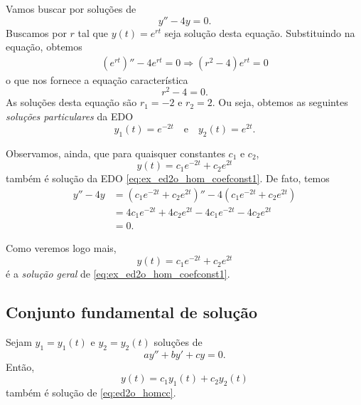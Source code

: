 \begin{ex}\label{ex:ed2o_homcc}
  Vamos buscar por soluções de
  \begin{equation}\label{eq:ex_ed2o_hom_coefconst1}
    y'' - 4y = 0.
  \end{equation}
  Buscamos por $r$ tal que $y(t) = e^{rt}$ seja solução desta equação. Substituindo na equação, obtemos
  \begin{align}
    \left(e^{rt}\right)'' - 4e^{rt} = 0 \Rightarrow (r^2 - 4)e^{rt} = 0
  \end{align}
  o que nos fornece a equação característica
  \begin{equation}
    r^2 - 4 = 0.
  \end{equation}
  As soluções desta equação são $r_1 = -2$ e $r_2 = 2$. Ou seja, obtemos as seguintes \emph{soluções particulares} da EDO
  \begin{equation}
    y_1(t) = e^{-2t}\quad\text{e}\quad y_2(t) = e^{2t}.
  \end{equation}

  Observamos, ainda, que para quaisquer constantes $c_1$ e $c_2$,
  \begin{equation}
    y(t) = c_1e^{-2t} + c_2e^{2t}
  \end{equation}
  também é solução da EDO \eqref{eq:ex_ed2o_hom_coefconst1}. De fato, temos
  \begin{align}
    y'' - 4y &= \left(c_1e^{-2t} + c_2e^{2t}\right)'' -4\left(c_1e^{-2t}+c_2e^{2t}\right) \\
             &= 4c_1e^{-2t} + 4c_2e^{2t} -4c_1e^{-2t} -4c_2e^{2t} \\
             &= 0.
  \end{align}

  Como veremos logo mais,
  \begin{equation}
    y(t) = c_1e^{-2t} + c_2e^{2t}
  \end{equation}
  é a \emph{solução geral} de \eqref{eq:ex_ed2o_hom_coefconst1}.
\end{ex}

\subsection{Conjunto fundamental de solução}

Sejam $y_1 = y_1(t)$ e $y_2 = y_2(t)$ soluções de
\begin{equation}\label{eq:ed2o_homcc}
  ay'' + by' + cy = 0.
\end{equation}
Então,
\begin{equation}
  y(t) = c_1y_1(t) + c_2y_2(t)
\end{equation}
também é solução de \eqref{eq:ed2o_homcc}.

